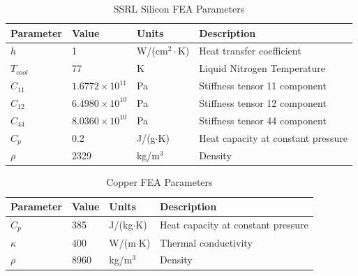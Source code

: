 \documentclass{iucr}
\begin{document}
\begin{table}

\caption{SSRL Silicon FEA Parameters}
\begin{tabular}{@{}llll@{}}
Parameter   & Value                   & Units                     & Description                        \\
\hline
$h$         & 1                       & W/(cm$^2\cdot$K)          & Heat transfer coefficient          \\
$T_{cool}$  & 77                      & K                         & Liquid Nitrogen Temperature        \\
$C_{11}$    & $1.6772\times 10^{11}$  & Pa                        & Stiffness tensor 11 component      \\
$C_{12}$    & $6.4980\times 10^{10}$  & Pa                        & Stiffness tensor 12 component      \\
$C_{44}$    & $8.0360\times 10^{10}$  & Pa                        & Stiffness tensor 44 component      \\
$C_p$       & 0.2                     & J/(g$\cdot$K)             & Heat capacity at constant pressure \\
$\rho$      &  2329                   & kg/m$^3$                  & Density                            \\
\end{tabular}
\label{ssrlsiliconFEA}
\end{table}

\begin{table}

\caption{Copper FEA Parameters}
\begin{tabular}{@{}llll@{}}
Parameter    & Value                  & Units                      & Description                        \\
\hline
$C_p$        & 385                    & J/(kg$\cdot$K)               & Heat capacity at constant pressure \\
$\kappa$     & 400                    & W/(m$\cdot$K)                & Thermal conductivity               \\ 
$\rho$       & 8960                   & kg/m$^3$                   & Density                            \\
\end{tabular}
\label{copperFEA}
\end{table}
\end{document}
